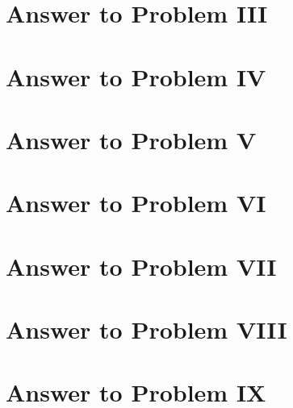 \documentclass[11pt,a4paper]{article}
\begin{document}
\clearpage
\section{Answer to Problem III}\label{sec:P03}


\clearpage
\section{Answer to Problem IV}\label{sec:P04}



\clearpage
\section{Answer to Problem V}\label{sec:P05}



\clearpage
\section{Answer to Problem VI}\label{sec:P06}



\clearpage
\section{Answer to Problem VII}\label{sec:P07}



\clearpage
\section{Answer to Problem VIII}\label{sec:P08}



\clearpage
\section{Answer to Problem IX}\label{sec:P09}
\end{document}
